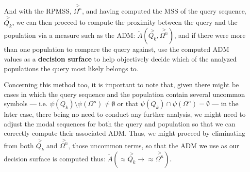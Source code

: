 \documentclass[a4paper, 18pt]{book} %
\begin{document}
And with the RPMSS, $\overset{>}{\Omega^n}$, and having computed the MSS of the query sequence, $\overset{>}{Q_k}$, we can then proceed to compute the proximity between the query and the population via a measure such as the ADM: $\tilde{A}(\overset{>}{Q_k},\overset{>}{\Omega^n})$, and if there were more than one population to compare the query against, use the computed ADM values as a \textbf{decision surface} to help objectively decide which of the analyzed populations the query most likely belongs to.

Concerning this method too, it is important to note that, given there might be cases in which the query sequence and the population contain several uncommon symbols --- i.e. $\psi(Q_k) \setminus \psi(\Omega^n) \neq \emptyset$ or that $\psi(Q_k) \cap \psi(\Omega^n) = \emptyset$ --- in the later case, there being no need to conduct any further analysis, we might need to adjust the modal sequences for both the query and population so that we can correctly compute their associated ADM. Thus, we might proceed by eliminating from both $\overset{>}{Q_k}$ and $\overset{>}{\Omega^n}$, those uncommon terms, so that the ADM we use as our decision surface is computed thus: $\tilde{A}(\approx\overset{>}{Q_k} \rightarrow \approx\overset{>}{\Omega^n})$.\\
\end{document}
